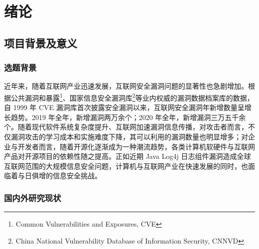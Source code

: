 \documentclass[a4paper,AutoFakeBold,oneside,12pt]{book}
\begin{document}
\blankmatter


\blankmatter


\blankmatter


\blankmatter


\frontmatter\tableofcontents %


\newpage\mainmatter
{}

\sloppy

\chapter{绪论}

\section{项目背景及意义}

\subsection{选题背景}

近年来，随着互联网产业迅速发展，互联网安全漏洞问题的显著性也急剧增加。根据公共漏洞和暴露\footnote{Common Vulnerabilities and Exposures, CVE}、国家信息安全漏洞库\footnote{China National Vulnerability Database of Information Security, CNNVD}等业内权威的漏洞数据档案库的数据\cite{download_cve_list}\cite{nvd_cpe_statistics}，自 1999 年 CVE 漏洞库首次披露安全漏洞以来，互联网安全漏洞年新增数量呈增长趋势。2019 年全年，新增漏洞两万余个；2020 年全年，新增漏洞三万五千余个。随着现代软件系统复杂度提升、互联网加速漏洞信息传播，对攻击者而言，不仅漏洞攻击的学习成本和实施难度下降，其可以利用的漏洞数量也明显增多\cite{vuldb_stats}；对企业与开发者而言，随着开源化逐渐成为一种潮流趋势，各类计算机软硬件与互联网产品对开源项目的依赖性随之提高。正如近期 Java Log4j 日志组件漏洞造成全球互联网范围的大规模信息安全问题，计算机与互联网产业在快速发展的同时，也面临着与日俱增的信息安全挑战。

\subsection{国内外研究现状}
\end{document}
